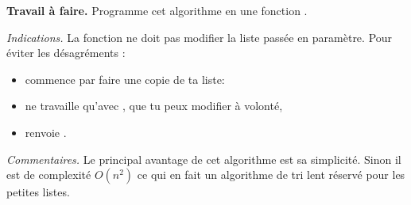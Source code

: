 \documentclass[11pt,class=report,crop=false]{standalone}
\begin{document}
\begin{activite}
 	\bigskip
	
	\textbf{Travail à faire.} Programme cet algorithme en une fonction .
	
		
	\emph{Indications.} La fonction ne doit pas modifier la liste passée en paramètre. Pour éviter les désagréments :
	\begin{itemize}
		\item commence par faire une copie de ta liste:		
		\item ne travaille qu'avec , que tu peux modifier à volonté,
		\item renvoie .
	\end{itemize}

    \emph{Commentaires.}
	Le principal avantage de cet algorithme est sa simplicité. Sinon il est de complexité $O(n^2)$ ce qui en fait un algorithme de tri lent réservé pour les petites listes.
    
	
\end{activite}


\end{document}
